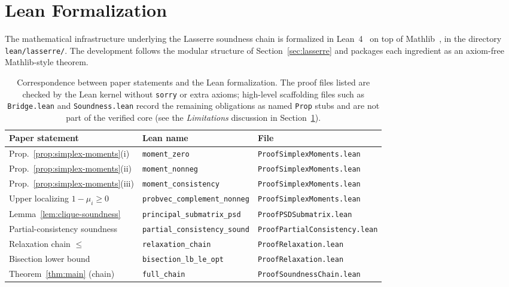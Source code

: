 \documentclass[11pt, letterpaper]{article}
\theoremstyle{paperplain}
\theoremstyle{paperdef}
\begin{document}
\section{Lean Formalization}\label{sec:formalization}

The mathematical infrastructure underlying the Lasserre soundness
chain is formalized in Lean~4~\cite{Lean4} on top of
Mathlib~\cite{Mathlib}, in the directory \texttt{lean/lasserre/}.
The development follows the modular structure of
Section~\ref{sec:lasserre} and packages each ingredient as an
axiom-free Mathlib-style theorem.

\begin{table}[h]
\centering\small
\begin{tabular}{lll}
  \toprule
  \textbf{Paper statement} & \textbf{Lean name} & \textbf{File} \\
  \midrule
  Prop.~\ref{prop:simplex-moments}(i) & \texttt{moment\_zero}
    & \texttt{ProofSimplexMoments.lean} \\
  Prop.~\ref{prop:simplex-moments}(ii) & \texttt{moment\_nonneg}
    & \texttt{ProofSimplexMoments.lean} \\
  Prop.~\ref{prop:simplex-moments}(iii) & \texttt{moment\_consistency}
    & \texttt{ProofSimplexMoments.lean} \\
  Upper localizing $1-\mu_i\ge 0$ & \texttt{probvec\_complement\_nonneg}
    & \texttt{ProofSimplexMoments.lean} \\
  Lemma~\ref{lem:clique-soundness} & \texttt{principal\_submatrix\_psd}
    & \texttt{ProofPSDSubmatrix.lean} \\
  Partial-consistency soundness & \texttt{partial\_consistency\_sound}
    & \texttt{ProofPartialConsistency.lean} \\
  Relaxation chain $\le$ & \texttt{relaxation\_chain}
    & \texttt{ProofRelaxation.lean} \\
  Bisection lower bound & \texttt{bisection\_lb\_le\_opt}
    & \texttt{ProofRelaxation.lean} \\
  Theorem~\ref{thm:main} (chain) & \texttt{full\_chain}
    & \texttt{ProofSoundnessChain.lean} \\
  \bottomrule
\end{tabular}
\caption{Correspondence between paper statements and the Lean
formalization.  The proof files listed are checked by the Lean kernel
without \texttt{sorry} or extra axioms; high-level scaffolding files
such as \texttt{Bridge.lean} and \texttt{Soundness.lean} record the
remaining obligations as named \texttt{Prop} stubs and are not part of
the verified core (see the \emph{Limitations} discussion in
Section~\ref{sec:formalization}).}
\label{tab:lean-map}
\end{table}
\end{document}
